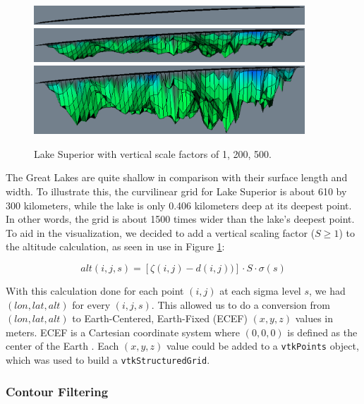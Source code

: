 \documentclass{article} %
\newcommand{\code}[1]{\texttt{#1}}
\begin{document}
\begin{figure}[htb]
   \centering
   \includegraphics[width=4in]{figures/vertscale1.eps}
   \includegraphics[width=4in]{figures/vertscale200.eps}
   \includegraphics[width=4in]{figures/vertscale500.eps}
   \caption{Lake Superior with vertical scale factors of 1, 200, 500.}
   \label{fig:vertscale}
\end{figure}

The Great Lakes are quite shallow in comparison with their surface length and width.  To illustrate this, the curvilinear grid for Lake Superior is about 610 by 300 kilometers, while the lake is only 0.406 kilometers deep at its deepest point.  In other words, the grid is about 1500 times wider than the lake's deepest point.  To aid in the visualization, we decided to add a vertical scaling factor ($S \ge 1$) to the altitude calculation, as seen in use in Figure \ref{fig:vertscale}:

\begin{equation}\label{eq:finalAlt}
alt(i, j, s) = [\zeta(i, j) - d(i, j))] \cdot S \cdot \sigma(s)
\end{equation}

With this calculation done for each point $(i, j)$ at each sigma level $s$, we had $(lon, lat, alt)$ for every $(i, j, s)$.  This allowed us to do a conversion from $(lon, lat, alt)$ to Earth-Centered, Earth-Fixed (ECEF) $(x, y, z)$ values in meters.  ECEF is a Cartesian coordinate system where $(0, 0, 0)$ is defined as the center of the Earth \cite{geodesy}.  Each $(x, y, z)$ value could be added to a \code{vtkPoints} object, which was used to build a \code{vtkStructuredGrid}.

\subsubsection{Contour Filtering}
\end{document}
